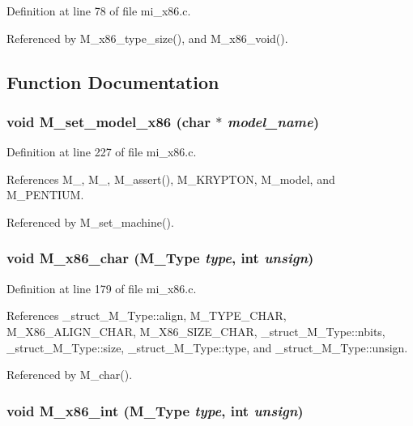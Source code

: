 Definition at line 78 of file mi\_\-x86.c.

Referenced by M\_\-x86\_\-type\_\-size(), and M\_\-x86\_\-void().

\subsection{Function Documentation}
\subsubsection{\setlength{\rightskip}{0pt plus 5cm}void M\_\-set\_\-model\_\-x86 (char $\ast$ {\em model\_\-name})}\label{mi__x86_8c_4b9658db28be939288b081434a0fb98a}




Definition at line 227 of file mi\_\-x86.c.

References M\_, M\_, M\_\-assert(), M\_\-KRYPTON, M\_\-model, and M\_\-PENTIUM.

Referenced by M\_\-set\_\-machine().
\subsubsection{\setlength{\rightskip}{0pt plus 5cm}void M\_\-x86\_\-char (\bf{M\_\-Type} {\em type}, int {\em unsign})}\label{mi__x86_8c_c87f1b1fd6219e94d47ba2735565f358}




Definition at line 179 of file mi\_\-x86.c.

References \_\-struct\_\-M\_\-Type::align, M\_\-TYPE\_\-CHAR, M\_\-X86\_\-ALIGN\_\-CHAR, M\_\-X86\_\-SIZE\_\-CHAR, \_\-struct\_\-M\_\-Type::nbits, \_\-struct\_\-M\_\-Type::size, \_\-struct\_\-M\_\-Type::type, and \_\-struct\_\-M\_\-Type::unsign.

Referenced by M\_\-char().
\subsubsection{\setlength{\rightskip}{0pt plus 5cm}void M\_\-x86\_\-int (\bf{M\_\-Type} {\em type}, int {\em unsign})}\label{mi__x86_8c_c2b292c07dd32dbf28e017f72cd280f6}




